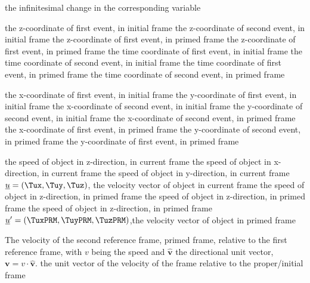 {the infinitesimal change in the corresponding variable}


{the z-coordinate of first event, in initial frame}
{the z-coordinate of second event, in initial frame}
{the z-coordinate of first event, in primed frame}
{the z-coordinate of first event, in primed frame}
{the time coordinate of first event, in initial frame}
{the time coordinate of second event, in initial frame}
{the time coordinate of first event, in primed frame}
{the time coordinate of second event, in primed frame}

{the x-coordinate of first event, in initial frame}
{the y-coordinate of first event, in initial frame}
{the x-coordinate of second event, in initial frame}
{the y-coordinate of second event, in initial frame}
{the x-coordinate of second event, in primed frame}
{the x-coordinate of first event, in primed frame}
{the y-coordinate of second event, in primed frame}
{the y-coordinate of first event, in primed frame}


{the speed of object in z-direction, in current frame}
{the speed of object in x-direction, in current frame}
{the speed of object in y-direction, in current frame}
{$\underline{u}=(\Tux,\Tuy,\Tuz)$, the velocity vector of object in current frame}
{the speed of object in z-direction, in primed frame}
{the speed of object in z-direction, in primed frame}
{the speed of object in z-direction, in primed frame}
{$\underline{u}'=(\TuxPRM,\TuyPRM,\TuzPRM)$,the velocity vector of object in primed frame}

{The velocity of the second reference frame, primed frame, relative to the first reference frame, with ${v}$ being the speed and ${\mathbf{\hat{v}}}$ the directional unit vector, ${\mathbf{v}}={v} \cdot {\mathbf{\hat{v}}}$.
}
{the unit vector of the velocity of the frame relative to the proper/initial frame}

